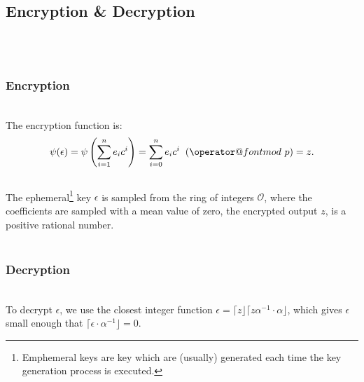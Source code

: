 \documentclass[10pt]{article}
\makeatletter
\def\imod#1{\allowbreak\mkern10mu({\operator@font mod}\,\,#1)}
\makeatother
\begin{document}
\\
\begin{tcolorbox}
\subsection*{Encryption \& Decryption}
\\ \\
\subsubsection*{Encryption}
\\
The encryption function is:
$$ \psi(\epsilon) = \psi \left( \sum_{i=1}^{n}e_{i}c^{i} \right) = \sum_{i=0}^{n} e_{i}c^{i}\imod{p}=z. $$
\\
The ephemeral\footnote{Emphemeral keys are key which are (usually)  generated each time the key generation process is executed. } key $\epsilon$ is sampled from the ring of integers $\mathcal{O}$, where the coefficients are sampled with a mean value of zero, the encrypted output $z$, is a positive rational number.
\\ \\
\subsubsection*{Decryption}
\\
To decrypt $\epsilon$, we use the closest integer function $\epsilon = \lceil z \rfloor \lceil z\alpha^{-1}\cdot \alpha \rfloor$, which gives $\epsilon$ small enough that $\lceil \epsilon \cdot \alpha^{-1}\rfloor = 0$. \\
\end{tcolorbox}
\end{document}
